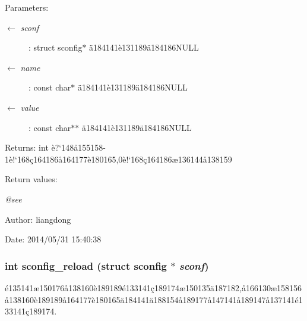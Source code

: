 \begin{Desc}
\item[Parameters:]
\begin{description}
\item[\mbox{$\leftarrow$} {\em sconf}]: struct sconfig$\ast$ \"{a}184141\`{e}131189\"{a}184186NULL \item[\mbox{$\leftarrow$} {\em name}]: const char$\ast$ \"{a}184141\`{e}131189\"{a}184186NULL \item[\mbox{$\leftarrow$} {\em value}]: const char$\ast$$\ast$ \"{a}184141\`{e}131189\"{a}184186NULL \end{description}
\end{Desc}
\begin{Desc}
\item[Returns:]int \`{e}?`148\aa{}155158-1\`{e}!`168\c{c}164186\aa{}164177\`{e}180165,0\`{e}!`168\c{c}164186\ae{}136144\aa{}138159 \end{Desc}
\begin{Desc}
\item[Return values:]
\begin{description}
\item[{\em @see}]\end{description}
\end{Desc}
\begin{Desc}
\item[Author:]liangdong \end{Desc}
\begin{Desc}
\item[Date:]2014/05/31 15:40:38 \end{Desc}
\subsubsection{\setlength{\rightskip}{0pt plus 5cm}int sconfig\_\-reload (struct sconfig $\ast$ {\em sconf})}\label{sconfig_8c_a5}


\'{e}135141\ae{}150176\aa{}138160\`{e}189189\'{e}133141\c{c}189174\ae{}150135\"{a}187182,\aa{}166130\ae{}158156\aa{}138160\`{e}189189\aa{}164177\`{e}180165\"{a}184141\"{a}188154\aa{}189177\aa{}147141\aa{}189147\aa{}137141\'{e}133141\c{c}189174. 

